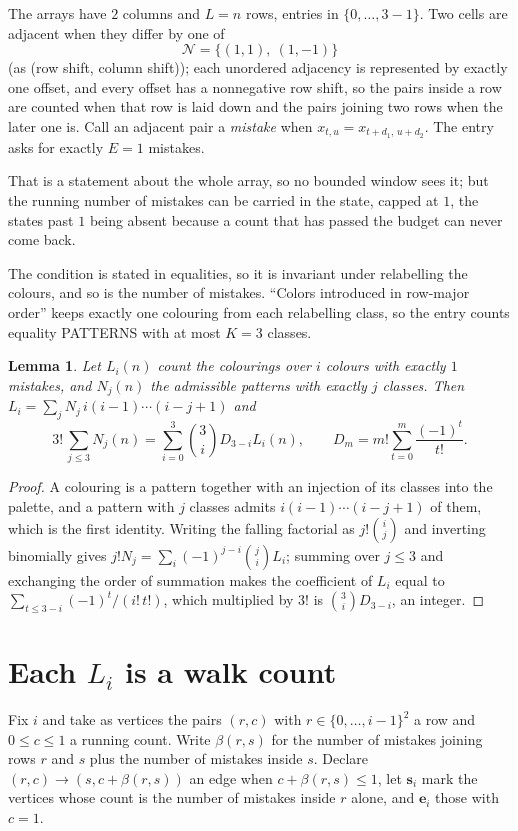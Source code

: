 \documentclass[11pt,a4paper]{article}
\theoremstyle{plain}
\newtheorem{lemma}[theorem]{Lemma}
\theoremstyle{definition}
\begin{document}
The arrays have $2$ columns and $L=n$ rows, entries in $\{0,\dots,3-1\}$.
Two cells are adjacent when they differ by one of
\[
\mathcal N=\{(1,1),\ (1,-1)\}
\]
(as (row shift, column shift)); each unordered adjacency is represented by exactly one
offset, and every offset has a nonnegative row shift, so the pairs inside a row are
counted when that row is laid down and the pairs joining two rows when the later one
is. Call an adjacent pair a \emph{mistake} when $x_{t,u}=x_{t+d_1,\,u+d_2}$. The entry asks for exactly
$E=1$ mistakes.

That is a statement about the whole array, so no bounded window sees it; but the running
number of mistakes can be carried in the state, capped at $1$, the states past $1$ being
absent because a count that has passed the budget can never come back.

The condition is stated in equalities, so it is invariant under relabelling the colours, and
so is the number of mistakes. ``Colors introduced in row-major order'' keeps exactly one
colouring from each relabelling class, so the entry counts equality PATTERNS with at most
$K=3$ classes.

\begin{lemma}\label{lem:inv}
Let $L_i(n)$ count the colourings over $i$ colours with exactly $1$ mistakes, and $N_j(n)$
the admissible patterns with exactly $j$ classes. Then
$L_i=\sum_j N_j\,i(i-1)\cdots(i-j+1)$ and
\[
3!\,\sum_{j\le3}N_j(n)=\sum_{i=0}^{3}\binom{3}{i}D_{3-i}L_i(n),
\qquad D_m=m!\sum_{t=0}^{m}\frac{(-1)^t}{t!} .
\]
\end{lemma}

\begin{proof}
A colouring is a pattern together with an injection of its classes into the palette, and a
pattern with $j$ classes admits $i(i-1)\cdots(i-j+1)$ of them, which is the first identity.
Writing the falling factorial as $j!\binom{i}{j}$ and inverting binomially gives
$j!N_j=\sum_i(-1)^{j-i}\binom{j}{i}L_i$; summing over $j\le3$ and exchanging the order
of summation makes the coefficient of $L_i$ equal to $\sum_{t\le3-i}(-1)^t/(i!\,t!)$,
which multiplied by $3!$ is $\binom{3}{i}D_{3-i}$, an integer.
\end{proof}

\section{Each $L_i$ is a walk count}

Fix $i$ and take as vertices the pairs $(r,c)$ with $r\in\{0,\dots,i-1\}^{2}$ a row
and $0\le c\le1$ a running count. Write $\beta(r,s)$ for the number of mistakes joining
rows $r$ and $s$ plus the number of mistakes inside $s$. Declare $(r,c)\to(s,c+\beta(r,s))$
an edge when $c+\beta(r,s)\le1$, let $\mathbf{s}_i$ mark the vertices whose count is the
number of mistakes inside $r$ alone, and $\mathbf{e}_i$ those with $c=1$.
\end{document}
